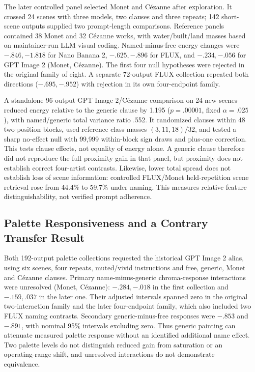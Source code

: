 The later controlled panel selected Monet and C\'ezanne after exploration.
It crossed 24 scenes with three models, two clauses and three repeats; 142
short-scene outputs supplied two prompt-length comparisons. Reference panels
contained 38 Monet and 32 C\'ezanne works, with water/built/land masses based on
maintainer-run LLM visual coding. Named-minus-free energy changes were
$-.846,-1.818$ for Nano Banana 2, $-.625,-.896$ for FLUX, and $-.234,-.056$ for
GPT Image 2 (Monet, C\'ezanne). The first four null hypotheses were rejected in
the original family of eight. A separate 72-output FLUX collection repeated both directions
($-.695,-.952$) with rejection in its own four-endpoint family.

A standalone 96-output GPT Image 2/C\'ezanne comparison on 24 new scenes reduced energy
relative to the generic clause by 1.195 ($p=.00001$, fixed $\alpha=.025$), with
named/generic total variance ratio .552. It randomized clauses within 48 two-position
blocks, used reference class masses $(3,11,18)/32$, and tested a sharp no-effect
null with 99,999 within-block sign draws and plus-one correction. This tests
clause effects, not equality of energy alone. A generic clause therefore did
not reproduce the full proximity gain in that panel, but proximity does not
establish correct four-artist contrasts. Likewise, lower total spread does
not establish loss of scene information: controlled FLUX/Monet held-repetition
scene retrieval rose from 44.4\% to 59.7\% under naming. This measures relative
feature distinguishability, not verified prompt adherence.

\subsection{Palette Responsiveness and a Contrary Transfer Result}
Both 192-output palette collections requested the historical GPT Image 2 alias,
using six scenes, four repeats, muted/vivid instructions and free, generic,
Monet and C\'ezanne clauses. Primary name-minus-generic chroma-response
interactions were unresolved (Monet, C\'ezanne):
$-.284,-.018$ in the first collection and $-.159,.037$ in the later one.
Their adjusted intervals spanned zero in the original two-interaction family and the later four-endpoint
family, which also included two FLUX naming contrasts.
Secondary generic-minus-free responses were $-.853$ and $-.891$, with nominal
95\% intervals excluding zero. Thus generic painting can attenuate measured
palette response without an identified additional name effect. Two palette
levels do not distinguish reduced gain from saturation or an operating-range
shift, and unresolved interactions do not demonstrate equivalence.

